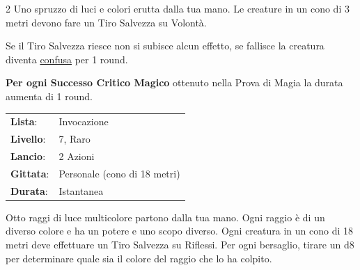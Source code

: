 \begin{multicols}{2}
Uno spruzzo di luci e colori erutta dalla tua mano. Le creature in un cono di 3 metri devono fare un Tiro Salvezza su Volontà.

Se il Tiro Salvezza riesce non si subisce alcun effetto, se fallisce la creatura diventa \hyperlink{confusionecondizione}{confusa} per 1 round.

\textbf{Per ogni Successo Critico Magico} ottenuto nella Prova di Magia la durata aumenta di 1 round.

\noindent\begin{tabularx}{\linewidth}{p{1.9cm}X}
	\rowcolor{gray!20}\textbf{Lista}: & Invocazione \\
	\textbf{Livello}: & 7, Raro \\
	\rowcolor{gray!20}\textbf{Lancio}: & 2 Azioni \\
	\textbf{Gittata}: & Personale (cono di 18 metri) \\
	\rowcolor{gray!20}\textbf{Durata}: & Istantanea \\
\end{tabularx}\smallskip

Otto raggi di luce multicolore partono dalla tua mano. Ogni raggio è di un diverso colore e ha un potere e uno scopo diverso. Ogni creatura in un cono di 18 metri deve effettuare un Tiro Salvezza su Riflessi. Per ogni bersaglio, tirare un d8 per determinare quale sia il colore del raggio che lo ha colpito.


\end{multicols}
